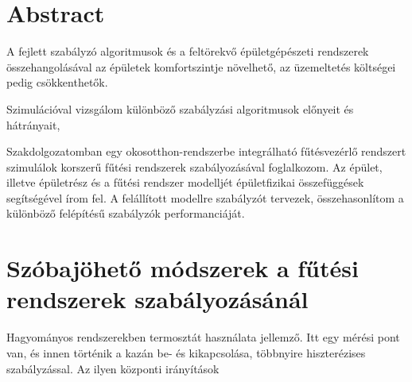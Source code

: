 \section{Abstract}

A fejlett szabályzó algoritmusok és a feltörekvő épületgépészeti rendszerek összehangolásával az épületek komfortszintje növelhető, az üzemeltetés költségei pedig csökkenthetők.

Szimulációval vizsgálom különböző szabályzási algoritmusok előnyeit és hátrányait, 

Szakdolgozatomban egy okosotthon-rendszerbe integrálható fűtésvezérlő rendszert szimulálok korszerű fűtési rendszerek szabályozásával foglalkozom. Az épület, illetve épületrész és a fűtési rendszer modelljét épületfizikai összefüggések segítségével írom fel. A felállított modellre szabályzót tervezek, összehasonlítom a különböző felépítésű szabályzók performanciáját.

\section{Szóbajöhető módszerek a fűtési rendszerek szabályozásánál}

Hagyományos rendszerekben termosztát használata jellemző. Itt egy mérési pont van, és innen történik a kazán be- és kikapcsolása, többnyire hiszterézises szabályzással. Az ilyen központi irányítások